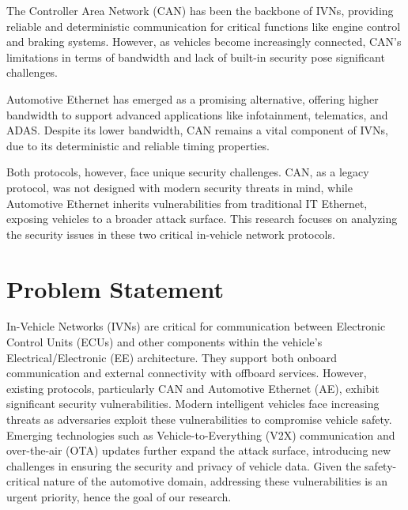 \documentclass{report}
\begin{document}
The Controller Area Network (CAN)  has been the backbone of IVNs, providing reliable and deterministic communication for critical functions like engine control and braking systems. However, as vehicles become increasingly connected, CAN's limitations in terms of bandwidth and lack of built-in security pose significant challenges.

Automotive Ethernet has emerged as a promising alternative, offering higher bandwidth to support advanced applications like infotainment, telematics, and ADAS.  Despite its lower bandwidth, CAN remains a vital component of IVNs, due to its deterministic and reliable timing properties.

Both protocols, however, face unique security challenges. CAN, as a legacy protocol, was not designed with modern security threats in mind, while Automotive Ethernet inherits vulnerabilities from traditional IT Ethernet, exposing vehicles to a broader attack surface. This research focuses on analyzing the security issues in these two critical in-vehicle network protocols.

\section{Problem Statement}
In-Vehicle Networks (IVNs) are critical for communication between Electronic Control Units (ECUs) and other components within the vehicle's Electrical/Electronic (EE) architecture. They support both onboard communication and external connectivity with offboard services. However, existing protocols, particularly CAN and Automotive Ethernet (AE), exhibit significant security vulnerabilities.
Modern intelligent vehicles face increasing threats as adversaries exploit these vulnerabilities to compromise vehicle safety. Emerging technologies such as Vehicle-to-Everything (V2X) communication and over-the-air (OTA) updates further expand the attack surface, introducing new challenges in ensuring the security and privacy of vehicle data. Given the safety-critical nature of the automotive domain, addressing these vulnerabilities is an urgent priority, hence the goal of our research.

\end{document}
